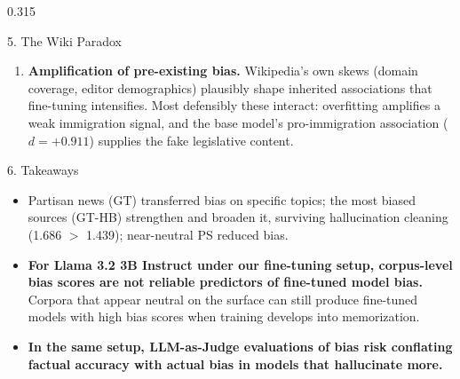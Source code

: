 \documentclass[final,t]{beamer}
\newcommand{\key}[1]{\textcolor{accent}{\textbf{#1}}}
\begin{document}
\begin{frame}[t]
\begin{columns}[t]
\begin{column}{0.315\paperwidth}
\begin{alertblock}{5. The Wiki Paradox}
\begin{enumerate}
    \item \key{Amplification of pre-existing bias.} Wikipedia's own skews (domain coverage, editor demographics) plausibly shape inherited associations that fine-tuning intensifies. Most defensibly these interact: overfitting amplifies a weak immigration signal, and the base model's pro-immigration association ($d = +0.911$) supplies the fake legislative content.
  \end{enumerate}
\end{alertblock}

\begin{block}{6. Takeaways}
  \begin{itemize}
    \item Partisan news (GT) transferred bias on specific topics; the most biased sources (GT-HB) strengthen and broaden it, surviving hallucination cleaning (1.686 $>$ 1.439); near-neutral PS reduced bias.
    \item \key{For Llama 3.2 3B Instruct under our fine-tuning setup, corpus-level bias scores are not reliable predictors of fine-tuned model bias.} Corpora that appear neutral on the surface can still produce fine-tuned models with high bias scores when training develops into memorization.
    \item \key{In the same setup, LLM-as-Judge evaluations of bias risk conflating factual accuracy with actual bias in models that hallucinate more.}
  \end{itemize}
\end{block}

\end{column}
\end{columns}
\end{frame}
\end{document}
